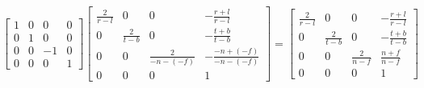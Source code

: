$$
\begin{bmatrix}
  1 & 0 & 0 & 0 \\
  0 & 1 & 0 & 0 \\
  0 & 0 & -1 & 0 \\
  0 & 0 & 0 & 1
\end{bmatrix}
\begin{bmatrix}
  \frac{2}{r-l} & 0 & 0 & -\frac{r+l}{r-l} \\
  0 & \frac{2}{t-b} & 0 & -\frac{t+b}{t-b} \\
  0 & 0 & \frac{2}{-n-(-f)} & -\frac{-n+(-f)}{-n-(-f)} \\
  0 & 0 & 0 & 1
\end{bmatrix}
=
\begin{bmatrix}
  \frac{2}{r-l} & 0 & 0 & -\frac{r+l}{r-l} \\
  0 & \frac{2}{t-b} & 0 & -\frac{t+b}{t-b} \\
  0 & 0 & \frac{2}{n-f} & \frac{n+f}{n-f} \\
  0 & 0 & 0 & 1
\end{bmatrix}
$$